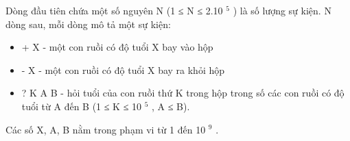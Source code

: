 Dòng đầu tiên chứa một số nguyên N (1 ≤ N ≤ 2.10   $^    5   $   ) là số lượng sự kiện. N dòng sau, mỗi dòng mô tả một sự kiện:  
\begin{itemize}
	\item     + X - một con ruồi có độ tuổi X bay vào hộp   
	\item     - X - một con ruồi có độ tuổi X bay ra khỏi hộp   
	\item     ? K A B - hỏi tuổi của con ruồi thứ K trong hộp trong số các con ruồi có độ tuổi từ A đến B (1 ≤ K ≤ 10    $^     5    $    , A ≤ B).   
\end{itemize}

   Các số X, A, B nằm trong phạm vi từ 1 đến 10   $^    9   $   .  

\